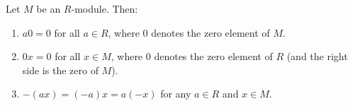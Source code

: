 Let $M$ be an $R$-module. Then:
\begin{enumerate}
\item $a0 = 0$ for all $a \in R$, where $0$ denotes the zero element of $M$.
\item $0x = 0$ for all $x \in M$, where $0$ denotes the zero element of $R$ (and the right side is the zero of $M$).
\item $-(ax) = (-a)x = a(-x)$ for any $a \in R$ and $x \in M$.
\end{enumerate}
